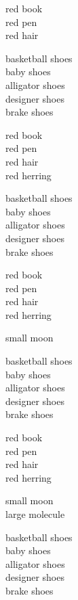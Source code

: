 \documentclass{article}
\begin{document}
\begin{huge}
red book\\
red pen\\
red hair


basketball shoes\\
baby shoes\\
alligator shoes\\
designer shoes\\
brake shoes

red book\\
red pen\\
red hair\\
red herring


basketball shoes\\
baby shoes\\
alligator shoes\\
designer shoes\\
brake shoes

red book\\
red pen\\
red hair\\
red herring

small moon


basketball shoes\\
baby shoes\\
alligator shoes\\
designer shoes\\
brake shoes

red book\\
red pen\\
red hair\\
red herring

small moon\\
large molecule


basketball shoes\\
baby shoes\\
alligator shoes\\
designer shoes\\
brake shoes


\end{huge}
\end{document}
